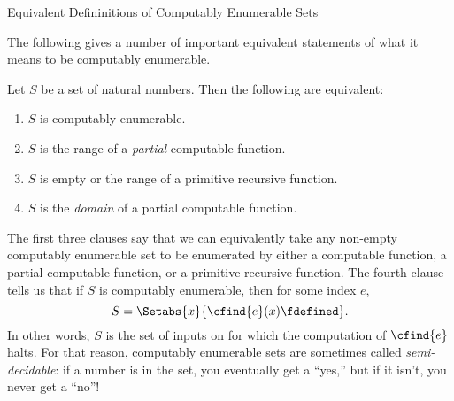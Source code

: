 \documentclass[../../../include/open-logic-section]{subfiles}
\begin{document}
  {Equivalent Defininitions of Computably Enumerable Sets}


The following gives a number of important equivalent statements of
what it means to be computably enumerable.

\begin{thm}
Let $S$ be a set of natural numbers. Then the following are
equivalent:
\begin{enumerate}
\item $S$ is computably enumerable.
\item $S$ is the range of a \emph{partial} computable function.
\item $S$ is empty or the range of a primitive recursive function.
\item $S$ is the \emph{domain} of a partial computable function.
\end{enumerate}
\end{thm}

\begin{explain}
The first three clauses say that we can equivalently take any non-empty
computably enumerable set to be enumerated by either a computable
function, a partial computable function, or a primitive recursive
function. The fourth clause tells us that if $S$ is computably
enumerable, then for some index $e$,
\[
S = \Setabs{x}{\cfind{e}(x) \fdefined}.
\]
In other words, $S$ is the set of inputs on for which the computation
of $\cfind{e}$ halts. For that reason, computably enumerable sets are
sometimes called \emph{semi-decidable}: if a number is in the set, you
eventually get a ``yes,'' but if it isn't, you never get a ``no''!{}
\end{explain}
\end{document}
